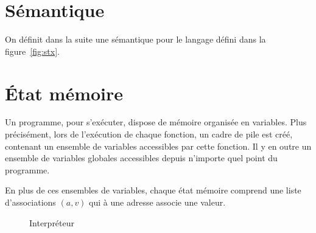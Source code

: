 \section{Sémantique}

On définit dans la suite une sémantique pour le langage défini dans la
figure~\ref{fig:stx}.

\section{État mémoire}

Un programme, pour s'exécuter, dispose de mémoire organisée en variables. Plus
précisément, lors de l'exécution de chaque fonction, un cadre de pile est créé,
contenant un ensemble de variables accessibles par cette fonction. Il y en outre
un ensemble de variables globales accessibles depuis n'importe quel point du
programme.

En plus de ces ensembles de variables, chaque état mémoire comprend une liste
d'associations $(a, v)$ qui à une adresse associe une valeur.

\begin{figure}





  \caption{Interpréteur}
  \label{fig:interp}
\end{figure}

